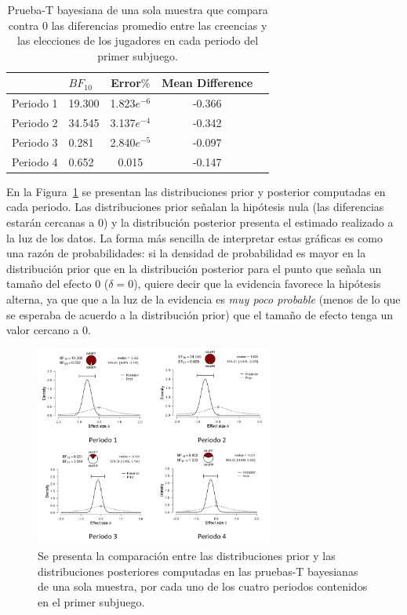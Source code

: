 \begin{table}
\caption[Diferencias Normalizadas en el Subjuego 1]{Prueba-T bayesiana de una sola muestra que compara contra 0 las diferencias promedio entre las creencias y las elecciones de los jugadores en cada periodo del primer subjuego.}
\label{DN_Sub1}
\centering
\begin{tabular}{l l | c c c}  %
\toprule
\textbf{} & \textbf{$BF_{10}$} & \textbf{Error$\%$} & \textbf{Mean Difference}\\
\midrule
Periodo 1 & 19.300 & 1.823$e^{-6}$ & -0.366 \\
Periodo 2 & 34.545 & 3.137$e^{-4}$ & -0.342 \\
Periodo 3 & 0.281 & 2.840$e^{-5}$ & -0.097 \\
Periodo 4 & 0.652 & 0.015 & -0.147 \\
\bottomrule
\end{tabular}
\end{table}

En la Figura~\ref{fig:DiferenciasNormalizadas_Subjuego1} se presentan las distribuciones prior y posterior computadas en cada periodo. Las distribuciones prior señalan la hipótesis nula (las diferencias estarán cercanas a $0$) y la distribución posterior presenta el estimado realizado a la luz de los datos. La forma más sencilla de interpretar estas gráficas es como una razón de probabilidades: si la densidad de probabilidad es mayor en la distribución prior que en la distribución posterior para el punto que señala un tamaño del efecto $0$ ($\delta = 0$), quiere decir que la evidencia favorece la hipótesis alterna, ya que que a la luz de la evidencia es \textit{muy poco probable} (menos de lo que se esperaba de acuerdo a la distribución prior) que el tamaño de efecto tenga un valor cercano a $0$.

\begin{figure}[th]
\centering
\includegraphics[width=0.70\textwidth]{Figures/Fig_1} 
\caption[Distribuciones prior y posterior de las Diferencias Normalizadas en el primer Subjuego, (prueba T bayesiana de una muestra)]{Se presenta la comparación entre las distribuciones prior y las distribuciones posteriores computadas en las pruebas-T bayesianas de una sola muestra, por cada uno de los cuatro periodos contenidos en el primer subjuego.}
\label{fig:DiferenciasNormalizadas_Subjuego1}
\end{figure}


